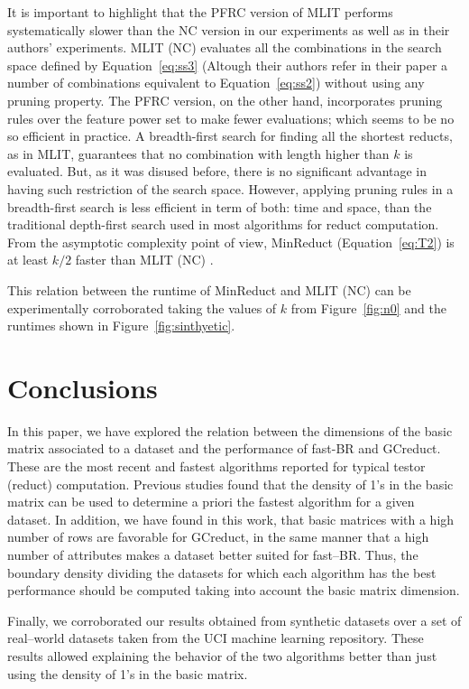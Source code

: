 \documentclass[citenumber]{llncs}
\begin{document}
	It is important to highlight that the PFRC version of MLIT performs systematically slower than the NC version in our experiments as well as in their authors' experiments.  MLIT (NC) evaluates all the combinations in the search space defined by Equation~\ref{eq:ss3} (Altough their authors refer in their paper a number of combinations equivalent to Equation~\ref{eq:ss2}) without using any pruning property. The PFRC version, on the other hand, incorporates pruning rules over the feature power set to make fewer evaluations; which seems to be no so efficient in practice. A breadth-first search for finding all the shortest reducts, as in MLIT, guarantees that no combination with length higher than $k$ is evaluated. But, as it was disused before, there is no significant advantage in having such restriction of the search space. However, applying pruning rules in a breadth-first search is less efficient in term of both: time and space, than the traditional depth-first search used in most algorithms for reduct computation. From the asymptotic complexity point of view, MinReduct (Equation~\ref{eq:T2}) is at least $k/2$ faster than MLIT (NC) \cite{Piza20}. 
	
	This relation between the runtime of MinReduct and MLIT (NC) can be experimentally corroborated taking the values of $k$ from Figure~\ref{fig:n0} and the runtimes shown in Figure~\ref{fig:sinthyetic}.
%
\section{Conclusions} \label{conclusions}
%	
	In this paper, we have explored the relation between the dimensions of the basic matrix associated to a dataset and the performance of fast-BR and GCreduct. These are the most recent and fastest algorithms reported for typical testor (reduct) computation. Previous studies found that the density of 1's in the basic matrix can be used to determine a priori the fastest algorithm for a given dataset. In addition, we have found in this work, that basic matrices with a high number of rows are favorable for GCreduct, in the same manner that a high number of attributes makes a dataset better suited for fast--BR. Thus, the boundary density dividing the datasets for which each algorithm has the best performance should be computed taking into account the basic matrix dimension.
	
	Finally, we corroborated our results obtained from synthetic datasets over a set of real--world datasets taken from the UCI machine learning repository. These results allowed explaining the behavior of the two algorithms better than just using the density of 1's in the basic matrix.
	
\end{document}
